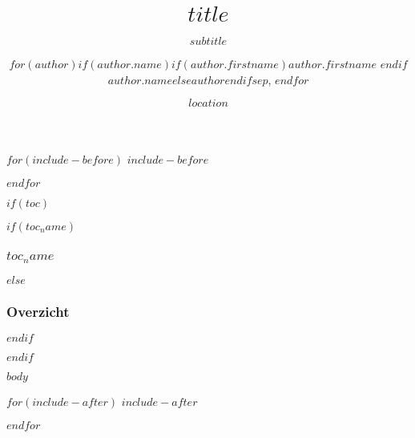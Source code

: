 \documentclass[
  $if(handout)$handout, beameroptions={$endif$ hyperref={colorlinks=true,citecolor=link.colour,linkcolor=link.colour,urlcolor=link.colour},
  $if(fontsize)$$fontsize$$else$10pt$endif$,
  xetex,
  noamsthm$if(aspect)$, aspectratio=$aspect$ $endif$$if(handout)$}$endif$
]{beamer$if(handout)$switch$endif$}
\title{$title$}
\subtitle{$subtitle$}
\author{
$for(author)$$if(author.name)$$if(author.firstname)$$author.firstname$ $endif$$author.name$$else$$author$$endif$$sep$, $endfor$
}
\institute{$institute$}
\date{$location$}
\date{}
\begin{document}
\begin{frame}[plain, label=intro, noframenumbering]
  \titlepage
\end{frame}

$for(include-before)$
$include-before$

$endfor$

$if(toc)$
\begin{frame}
$if(toc_name)$
  \frametitle{$toc_name$}
$else$
  \frametitle{Overzicht}
$endif$
	\tableofcontents
\end{frame}
$endif$

$body$

$for(include-after)$
$include-after$

$endfor$
\end{document}
